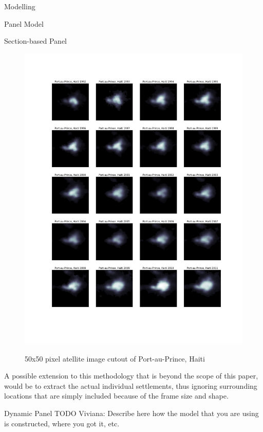 \documentclass[12pt,fleqn,leqno,letterpaper]{article}
\begin{document}
\begin{section}{Modelling}
\begin{subsection}{Panel Model}
\begin{subsubsection}{Section-based Panel}
\begin{figure}[t!]
        \includegraphics[width=\linewidth]{haiti_luminosity_series}\label{fig:haiti_luminosity_series}
        \caption{50x50 pixel atellite image cutout of Port-au-Prince, Haiti}
      \end{figure}
      A possible extension to this methodology that is beyond the scope of this paper, would be to extract the actual individual settlements, thus ignoring surrounding locations that are simply included because of the frame size and shape.
    \end{subsubsection}
    \begin{subsubsection}{Dynamic Panel}
      TODO Viviana: Describe here how the model that you are using is constructed, where you got it, etc.
    \end{subsubsection}
  \end{subsection}
\end{section}
\end{document}
